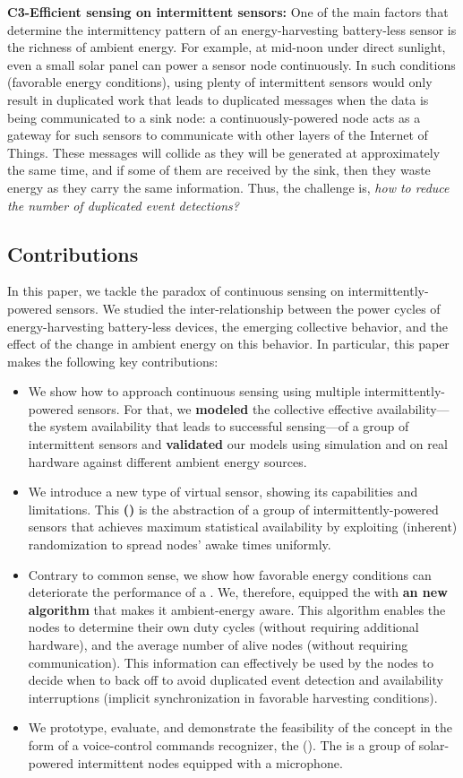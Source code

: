 \noindent\textbf{C3-Efficient sensing on intermittent sensors:} 
One of the main factors that determine the intermittency pattern of an energy-harvesting battery-less sensor is the richness of ambient energy. 
For example, at mid-noon under direct sunlight, even a small solar panel can power a sensor node continuously. 
In such conditions (favorable energy conditions), using plenty of intermittent sensors would only result in duplicated work that leads to duplicated messages when the data is being communicated to a sink node: a continuously-powered node acts as a gateway for such sensors to communicate with other layers of the Internet of Things. These messages will collide as they will be generated at approximately the same time, and if some of them are received by the sink, then they waste energy as they carry the same information. Thus, the challenge is, \emph{how to reduce the number of duplicated event detections?} 
%
\subsection{Contributions}
In this paper, we tackle the paradox of continuous sensing on intermittently-powered sensors. 
We studied the inter-relationship between the power cycles of energy-harvesting battery-less devices, the emerging collective behavior, and the effect of the change in ambient energy on this behavior. In particular, this paper makes the following key contributions:
\begin{itemize}
%
\item We show how to approach continuous sensing using multiple intermittently-powered sensors. 
For that, we \textbf{modeled} the collective effective availability---the system availability that leads to successful sensing---of a group of intermittent sensors and \textbf{validated} our models using simulation and on real hardware against different ambient energy sources. 
%
\item We introduce a new type of virtual sensor, showing its capabilities and limitations. This \textbf{\fullcis (\cis)} is the abstraction of a group of intermittently-powered sensors that achieves maximum statistical availability by exploiting (inherent) randomization to spread nodes' awake times uniformly.
% 
\item Contrary to common sense, we show how favorable energy conditions can deteriorate the performance of a \cis. We, therefore, equipped the \cis with \textbf{an new algorithm} that makes it ambient-energy aware. This algorithm enables the nodes to determine their own duty cycles (without requiring additional hardware), and the average number of alive nodes (without requiring communication). This information can effectively be used by the nodes to decide when to back off to avoid duplicated event detection and availability interruptions (implicit synchronization in favorable harvesting conditions).
%
\item We prototype, evaluate, and demonstrate the feasibility of the \fullcis concept in the form of a voice-control commands recognizer, the \textbf{\fullCIM} (\textbf{\cim}). The \cim is a group of solar-powered intermittent nodes equipped with a microphone.
\end{itemize}


